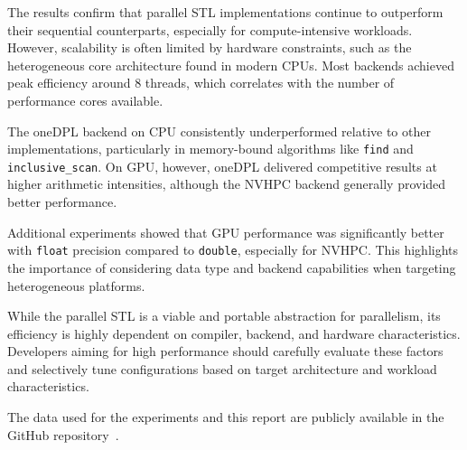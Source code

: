 \documentclass[sigconf]{acmart}
\begin{document}
The results confirm that parallel STL implementations continue to outperform
their sequential counterparts, especially for compute-intensive workloads.
However, scalability is often limited by hardware constraints, such as the
heterogeneous core architecture found in modern CPUs. Most backends achieved
peak efficiency around 8 threads, which correlates with the number of
performance cores available.

The oneDPL backend on CPU consistently underperformed relative to other
implementations, particularly in memory-bound algorithms like \texttt{find} and
\texttt{inclusive\_scan}. On GPU, however, oneDPL delivered competitive results
at higher arithmetic intensities, although the NVHPC backend generally provided
better performance.

Additional experiments showed that GPU performance was significantly better
with \texttt{float} precision compared to \texttt{double}, especially for
NVHPC. This highlights the importance of considering data type and backend
capabilities when targeting heterogeneous platforms.

While the parallel STL is a viable and portable abstraction for parallelism,
its efficiency is highly dependent on compiler, backend, and hardware
characteristics. Developers aiming for high performance should carefully
evaluate these factors and selectively tune configurations based on target
architecture and workload characteristics.

The data used for the experiments and this report are publicly available in the
GitHub repository~\cite{pSTL-Bench-report:github}.
\end{document}
